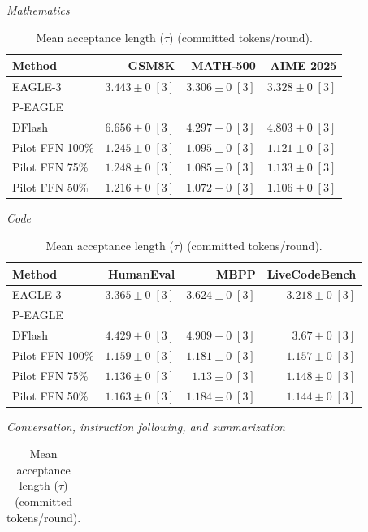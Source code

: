 \begin{table}[!tp]
\centering
\small
\setlength{\tabcolsep}{3pt}
\caption{Mean acceptance length (\(\tau\)) (committed tokens/round).}
\label{tab:acceptance-length}
\textit{Mathematics}\par\smallskip
\begin{tabular}{@{}>{\raggedright\arraybackslash}p{3.7cm}rrr@{}}
\toprule
Method & GSM8K & MATH-500 & AIME 2025 \\
\midrule
EAGLE-3 & \(3.443 \pm 0\;[3]\) & \(3.306 \pm 0\;[3]\) & \(3.328 \pm 0\;[3]\) \\
P-EAGLE &  &  &  \\
DFlash & \(\mathbf{6.656} \pm 0\;[3]\) & \(\mathbf{4.297} \pm 0\;[3]\) & \(\mathbf{4.803} \pm 0\;[3]\) \\
Pilot FFN 100\% & \(1.245 \pm 0\;[3]\) & \(1.095 \pm 0\;[3]\) & \(1.121 \pm 0\;[3]\) \\
Pilot FFN 75\% & \(1.248 \pm 0\;[3]\) & \(1.085 \pm 0\;[3]\) & \(1.133 \pm 0\;[3]\) \\
Pilot FFN 50\% & \(1.216 \pm 0\;[3]\) & \(1.072 \pm 0\;[3]\) & \(1.106 \pm 0\;[3]\) \\
\bottomrule
\end{tabular}
\par\medskip
\textit{Code}\par\smallskip
\begin{tabular}{@{}>{\raggedright\arraybackslash}p{3.7cm}rrr@{}}
\toprule
Method & HumanEval & MBPP & LiveCodeBench \\
\midrule
EAGLE-3 & \(3.365 \pm 0\;[3]\) & \(3.624 \pm 0\;[3]\) & \(3.218 \pm 0\;[3]\) \\
P-EAGLE &  &  &  \\
DFlash & \(\mathbf{4.429} \pm 0\;[3]\) & \(\mathbf{4.909} \pm 0\;[3]\) & \(\mathbf{3.67} \pm 0\;[3]\) \\
Pilot FFN 100\% & \(1.159 \pm 0\;[3]\) & \(1.181 \pm 0\;[3]\) & \(1.157 \pm 0\;[3]\) \\
Pilot FFN 75\% & \(1.136 \pm 0\;[3]\) & \(1.13 \pm 0\;[3]\) & \(1.148 \pm 0\;[3]\) \\
Pilot FFN 50\% & \(1.163 \pm 0\;[3]\) & \(1.184 \pm 0\;[3]\) & \(1.144 \pm 0\;[3]\) \\
\bottomrule
\end{tabular}
\par\medskip
\textit{Conversation, instruction following, and summarization}\par\smallskip
\begin{tabular}{@{}>{\raggedright\arraybackslash}p{3.7cm}rrrr@{}}

\end{tabular}
\end{table}
